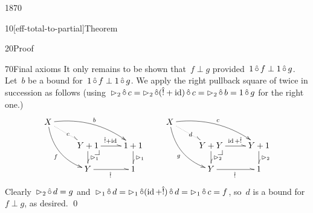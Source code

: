 \begin{parsec}{1870}
\begin{point}{10}[eff-total-to-partial]{Theorem}
\begin{point}{20}{Proof}
\begin{point}{70}{Final axioms}
It only remains to be shown that~$f \perp g$
    provided~$1 \mathop{\hat\circ} f \perp 1 \mathop{\hat\circ} g$.
Let~$b$ be a bound for~$1 \mathop{\hat\circ} f \perp 1 \mathop{\hat\circ} g$.
We apply the right pullback square of 
    twice  in succession as follows
    (using~$\mathord{\vartriangleright}_2 \mathop{\hat\circ} c
                = \mathord{\vartriangleright}_2 \mathop{\hat\circ} (\hat{!} + \operatorname{id}) \mathop{\hat\circ} c
                = \mathord{\vartriangleright}_2 \mathop{\hat\circ} b = 1\mathop{\hat\circ} g$ for the right one.)
\begin{equation*}
    \xymatrix@R-.8pc{
        X \ar@^{.>}[rd]|{c}
    \ar@/^1pc/[rrd]^{b}
        \ar@/_1pc/[rdd]_f
        \\& Y+1 \pullback
        \ar@^{>}[r]^{\hat! + \id}
        \ar@^{>}[d]^{\pproj_1}
    & 1+1
        \ar@^{>}[d]^{\pproj_1}
        \\& Y
        \ar@^{>}[r]_{\hat!}
&1
} \qquad
    \xymatrix@R-.8pc{
        X \ar@^{.>}[rd]|{d}
    \ar@/^1pc/[rrd]^{c}
        \ar@/_1pc/[rdd]_g
        \\& Y+Y \pullback
        \ar@^{>}[r]^{\id + \hat!}
        \ar@^{>}[d]^{\pproj_2}
    & Y+1
        \ar@^{>}[d]^{\pproj_2}
        \\& Y
        \ar@^{>}[r]_{\hat!}
&1
}
\end{equation*}
Clearly~$\mathord{\vartriangleright}_2 \mathop{\hat\circ} d = g$
    and~$
    \mathord{\vartriangleright}_1 \mathop{\hat\circ} d
     =  \mathord{\vartriangleright}_1 \mathop{\hat\circ} (\operatorname{id} + \hat! )\mathop{\hat\circ} d
     =  \mathord{\vartriangleright}_1 \mathop{\hat\circ} c  =  f$, so~$d$ is a bound for~$f \perp g$,
     as desired. \qed
\end{point}
\end{point}
\end{point}
\end{parsec}
